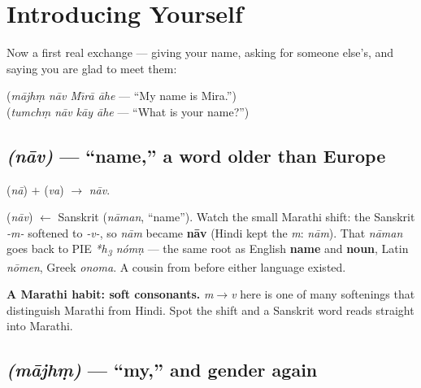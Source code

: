 \chapter{Introducing Yourself}
\label{ch:introductions}

Now a first real exchange --- giving your name, asking for someone else's, and
saying you are glad to meet them:

\begin{center}
 \quad(\emph{m\=ajh\d{m} n\=av M\={\i}r\=a \=ahe} --- ``My name is Mira.'')\\
 \quad(\emph{tumch\d{m} n\=av k\=ay \=ahe} --- ``What is your name?'')
\end{center}

\section{ \emph{(n\=av)} --- ``name,'' a word older than Europe}
\label{lesson:naav}

\begin{sounds}
 (\emph{n\=a}) $+$  (\emph{va}) $\to$  \emph{n\=av}.
\end{sounds}

\begin{cousinweb}
 (\emph{n\=av}) $\leftarrow$ Sanskrit  (\emph{n\=aman},
``name''). Watch the small Marathi shift: the Sanskrit \emph{-m-} softened to
\emph{-v-}, so \emph{n\=am} became \textbf{n\=av} (Hindi kept the \emph{m}:
\emph{n\=am}). That \emph{n\=aman} goes back to PIE \emph{*h\textsubscript{3}%
n\'{o}mn\d{}} --- the same root as English \textbf{name} and \textbf{noun}, Latin
\emph{n\=omen}, Greek \emph{onoma}. A cousin from before either language existed.
\end{cousinweb}

\begin{grammarlens}
\textbf{A Marathi habit: soft consonants.} \emph{m}$\to$\emph{v} here is one of
many softenings that distinguish Marathi from Hindi. Spot the shift and a
Sanskrit word reads straight into Marathi.
\end{grammarlens}

\section{ \emph{(m\=ajh\d{m})} --- ``my,'' and gender again}
\label{lesson:majhe}


